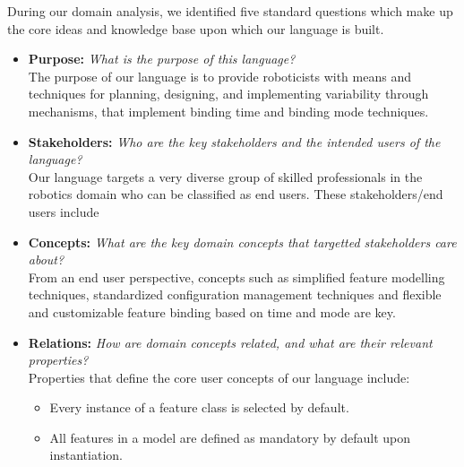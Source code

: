 \documentclass[conference]{IEEEtran}
\begin{document}
During our domain analysis, we identified five standard questions which make up the core ideas and knowledge base upon which our language is built. 
    \begin{itemize}
        \item \textbf{Purpose: } \textit{What is the purpose of this language?}\\
        The purpose of our language is to provide roboticists with means and techniques for planning, designing, and implementing variability through mechanisms, that implement binding time and binding mode techniques.
        \item \textbf{Stakeholders: } \textit{Who are the key stakeholders and the intended users of the language?}\\ Our language targets a very diverse group of skilled professionals in the robotics domain who can be classified as end users. These stakeholders/end users include 
        \item \textbf{Concepts: }\textit{What are the key domain concepts that targetted stakeholders care about?}\\ From an end user perspective, concepts such as simplified feature modelling techniques, standardized configuration management techniques and flexible and customizable feature binding based on time and mode are key.
        \item \textbf{Relations: }\textit{How are domain concepts related, and what are their relevant properties?}\\
        Properties that define the core user concepts of our language include:
        \begin{itemize}
            \item Every instance of a feature class is selected by default.
            \item All features in a model are defined as mandatory by default upon instantiation.

\end{itemize}
\end{itemize}
\end{document}
